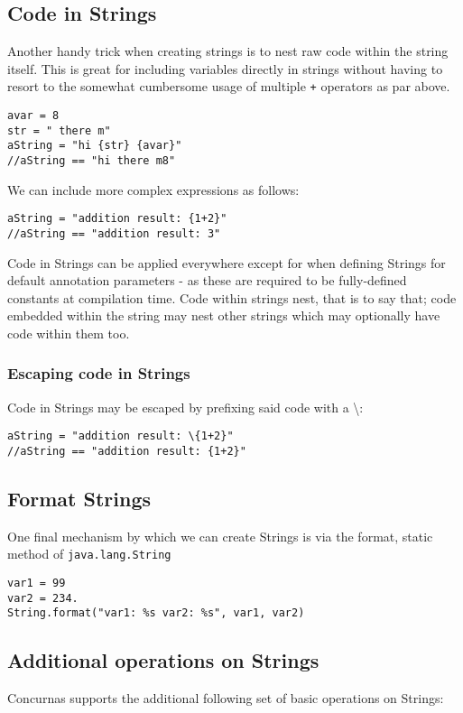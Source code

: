 \documentclass[conc-doc]{subfiles}
\begin{document}
\subsection{Code in Strings}
Another handy trick when creating strings is to nest raw code within the string itself. This is great for including variables directly in strings without having to resort to the somewhat cumbersome usage of multiple \lstinline{+} operators as par above.

\begin{lstlisting}
avar = 8
str = " there m"
aString = "hi {str} {avar}"
//aString == "hi there m8"
\end{lstlisting}

We can include more complex expressions as follows:
\begin{lstlisting}
aString = "addition result: {1+2}"
//aString == "addition result: 3"
\end{lstlisting}

Code in Strings can be applied everywhere except for when defining Strings for default annotation parameters - as these are required to be fully-defined constants at compilation time. Code within strings nest, that is to say that; code embedded within the string may nest other strings which may optionally have code within them too.

\subsubsection{Escaping code in Strings}
Code in Strings may be escaped by prefixing said code with a \textbackslash:
\begin{lstlisting}
aString = "addition result: \{1+2}"
//aString == "addition result: {1+2}"
\end{lstlisting}

\subsection{Format Strings}
One final mechanism by which we can create Strings is via the format, static method of \lstinline{java.lang.String}
\begin{lstlisting}
var1 = 99
var2 = 234.
String.format("var1: %s var2: %s", var1, var2)
\end{lstlisting}

\subsection{Additional operations on Strings}
Concurnas supports the additional following set of basic operations on Strings:
\end{document}
